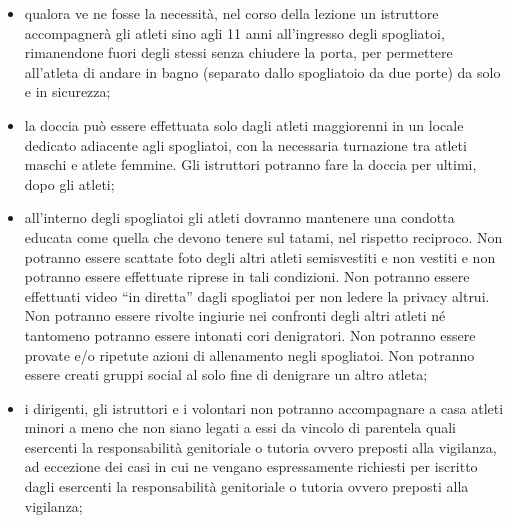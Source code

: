 \documentclass{djtsdoc}
\begin{document}
\begin{enumerate}
\begin{enumerate}
\begin{itemize}
				\item qualora ve ne fosse la necessità, nel corso della lezione un istruttore accompagnerà gli atleti sino agli 11 anni all'ingresso degli spogliatoi, rimanendone fuori degli stessi senza chiudere la porta, per permettere all'atleta di andare in bagno (separato dallo spogliatoio da due porte) da solo e in sicurezza;
				\item la doccia può essere effettuata solo dagli atleti maggiorenni in un locale dedicato adiacente agli spogliatoi, con la necessaria turnazione tra atleti maschi e atlete femmine. Gli istruttori potranno fare la doccia per ultimi, dopo gli atleti;
				\item all'interno degli spogliatoi gli atleti dovranno mantenere una condotta educata come quella che devono tenere sul tatami, nel rispetto reciproco. Non potranno essere scattate foto degli altri atleti semisvestiti e non vestiti e non potranno essere effettuate riprese in tali condizioni. Non potranno essere effettuati video “in diretta” dagli spogliatoi per non ledere la privacy altrui. Non potranno essere rivolte ingiurie nei confronti degli altri atleti né tantomeno potranno essere intonati cori denigratori. Non potranno essere provate e/o ripetute azioni di allenamento negli spogliatoi. Non potranno essere creati gruppi social al solo fine di denigrare un altro atleta;
				\item i dirigenti, gli istruttori e i volontari non potranno accompagnare a casa atleti minori a meno che non siano legati a essi da vincolo di parentela quali esercenti la responsabilità genitoriale o tutoria ovvero preposti alla vigilanza, ad eccezione dei casi in cui ne vengano espressamente richiesti per iscritto dagli esercenti la responsabilità genitoriale o tutoria ovvero preposti alla vigilanza;

\end{itemize}
\end{enumerate}
\end{enumerate}
\end{document}

